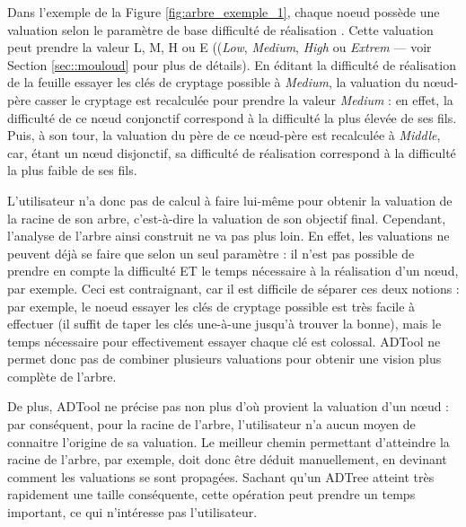	Dans l'exemple de la {\sc Figure} \ref{fig:arbre_exemple_1}, chaque noeud possède une valuation selon le paramètre de base \og difficulté de réalisation \fg{}. Cette valuation peut prendre la valeur L, M, H ou E ((\emph{Low}, \emph{Medium}, \emph{High} ou \emph{Extrem} --- voir Section \ref{sec::mouloud} pour plus de détails). En éditant la difficulté de réalisation de la feuille \og essayer les clés de cryptage possible \fg{}  à \emph{Medium}, la valuation du nœud-père \og casser le cryptage \fg{} est recalculée pour prendre la valeur \emph{Medium} : en effet, la difficulté de ce nœud conjonctif correspond à la difficulté la plus élevée de ses fils. Puis, à son tour, la valuation du père de ce nœud-père est recalculée à \emph{Middle}, car, étant un nœud disjonctif, sa difficulté de réalisation correspond à la difficulté la plus faible de ses fils.
	
	L'utilisateur n'a donc pas de calcul à faire lui-même pour obtenir la valuation de la racine de son arbre, c'est-à-dire la valuation de son objectif final. Cependant, l'analyse de l'arbre ainsi construit ne va pas plus loin. En effet, les valuations ne peuvent déjà se faire que selon un seul paramètre : il n'est pas possible de prendre en compte la \og difficulté \fg{} ET le \og temps nécessaire \fg{} à la réalisation d'un nœud, par exemple. Ceci est contraignant, car il est difficile de séparer ces deux notions : par exemple, le noeud \og essayer les clés de cryptage possible \fg{} est très facile à effectuer (il suffit de taper les clés une-à-une jusqu'à trouver la bonne), mais le temps nécessaire pour effectivement essayer chaque clé est colossal. ADTool ne permet donc pas de combiner plusieurs valuations pour obtenir une vision plus complète de l'arbre.
	
	 De plus, ADTool ne précise pas non plus d'où provient la valuation d'un nœud : par conséquent, pour la racine de l'arbre, l'utilisateur n'a aucun moyen de connaitre l'origine de sa valuation. Le \og meilleur chemin \fg{} permettant d'atteindre la racine de l'arbre, par exemple, doit donc être déduit manuellement, en devinant comment les valuations se sont propagées. Sachant qu'un ADTree atteint très rapidement une taille conséquente, cette opération peut prendre un temps important, ce qui n'intéresse pas l'utilisateur.
	 
	 